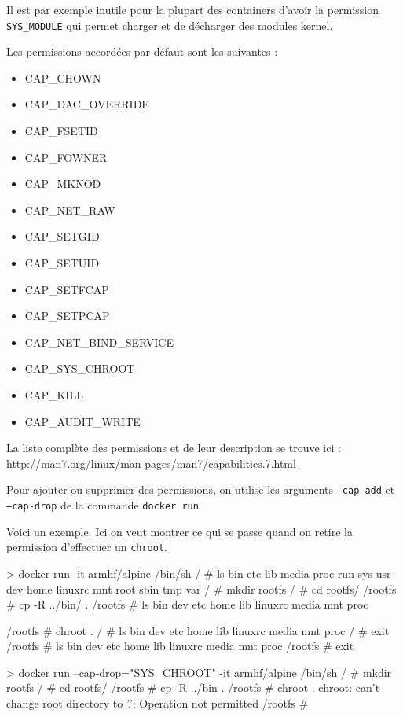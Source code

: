 \documentclass[11pt,a4paper,oneside]{report}
\newcommand{\code}[1]{\texttt{#1}}
\begin{document}
Il est par exemple inutile pour la plupart des containers d'avoir la permission \code{SYS\_MODULE} qui permet charger et de décharger des modules kernel.

Les permissions accordées par défaut sont les suivantes\cite{github_docker_kernel_capabilities} :
\begin{itemize}
\item CAP\_CHOWN
\item CAP\_DAC\_OVERRIDE
\item CAP\_FSETID
\item CAP\_FOWNER
\item CAP\_MKNOD
\item CAP\_NET\_RAW
\item CAP\_SETGID
\item CAP\_SETUID
\item CAP\_SETFCAP
\item CAP\_SETPCAP
\item CAP\_NET\_BIND\_SERVICE
\item CAP\_SYS\_CHROOT
\item CAP\_KILL
\item CAP\_AUDIT\_WRITE
\end{itemize}

La liste complète des permissions et de leur description se trouve ici : \url{http://man7.org/linux/man-pages/man7/capabilities.7.html}

Pour ajouter ou supprimer des permissions, on utilise les arguments \code{--cap-add} et \code{--cap-drop} de la commande \code{docker run}.

Voici un exemple. Ici on veut montrer ce qui se passe quand on retire la permission d'effectuer un \code{chroot}.
\begin{textcode}
> docker run -it armhf/alpine /bin/sh
/ # ls
bin   etc   lib       media   proc   run    sys   usr
dev   home  linuxrc   mnt     root   sbin   tmp   var
/ # mkdir rootfs
/ # cd rootfs/
/rootfs # cp -R ../bin/ .
/rootfs # ls
bin   dev   etc   home   lib   linuxrc  media   mnt   proc

/rootfs # chroot .
/ # ls
bin   dev   etc   home   lib   linuxrc  media   mnt   proc
/ # exit
/rootfs # ls
bin   dev   etc   home   lib   linuxrc  media   mnt   proc
/rootfs # exit


> docker run --cap-drop="SYS_CHROOT" -it armhf/alpine /bin/sh
/ # mkdir rootfs
/ # cd rootfs/
/rootfs # cp -R ../bin .
/rootfs # chroot .
chroot: can't change root directory to '.': Operation not permitted
/rootfs #
\end{textcode}
\end{document}
